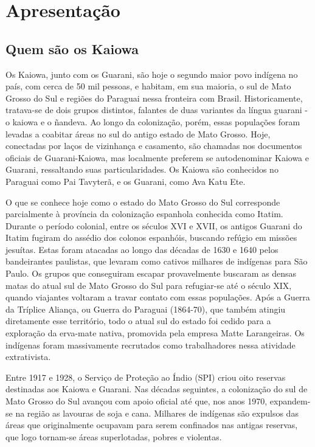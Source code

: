 \chapter{Apresentação}

\section{Quem são os Kaiowa}

Os Kaiowa, junto com os Guarani, são hoje o segundo maior povo indígena
no país, com cerca de 50 mil pessoas, e habitam, em sua maioria, o sul
de Mato Grosso do Sul e regiões do Paraguai nessa fronteira com Brasil.
Historicamente, tratava-se de dois grupos distintos, falantes de duas
variantes da língua guarani - o kaiowa e o ñandeva. Ao longo da
colonização, porém, essas populações foram levadas a coabitar áreas no
sul do antigo estado de Mato Grosso. Hoje, conectadas por laços de
vizinhança e casamento, são chamadas nos documentos oficiais de
Guarani-Kaiowa, mas localmente preferem se autodenominar Kaiowa e
Guarani, ressaltando suas particularidades. Os Kaiowa são conhecidos no
Paraguai como Pai Tavyterã, e os Guarani, como Ava Katu Ete.

O que se conhece hoje como o estado do Mato Grosso do Sul corresponde
parcialmente à província da colonização espanhola conhecida como Itatim.
Durante o período colonial, entre os séculos XVI e XVII, os antigos
Guarani do Itatim fugiram do assédio dos colonos espanhóis, buscando
refúgio em missões jesuítas. Estas foram atacadas ao longo das décadas
de 1630 e 1640 pelos bandeirantes paulistas, que levaram como cativos
milhares de indígenas para São Paulo. Os grupos que conseguiram escapar
provavelmente buscaram as densas matas do atual sul de Mato Grosso do
Sul para refugiar-se até o século XIX, quando viajantes voltaram a
travar contato com essas populações. Após a Guerra da Tríplice Aliança,
ou Guerra do Paraguai (1864-70), que também atingiu diretamente esse
território, todo o atual sul do estado foi cedido para a exploração da
erva-mate nativa, promovida pela empresa Matte Larangeiras. Os indígenas
foram massivamente recrutados como trabalhadores nessa atividade
extrativista.

Entre 1917 e 1928, o Serviço de Proteção ao Índio (SPI) criou oito
reservas destinadas aos Kaiowa e Guarani. Nas décadas seguintes, a
colonização do sul de Mato Grosso do Sul avançou com apoio oficial até
que, nos anos 1970, expandem-se na região as lavouras de soja e cana.
Milhares de indígenas são expulsos das áreas que originalmente ocupavam
para serem confinados nas antigas reservas, que logo tornam-se áreas
superlotadas, pobres e violentas.

